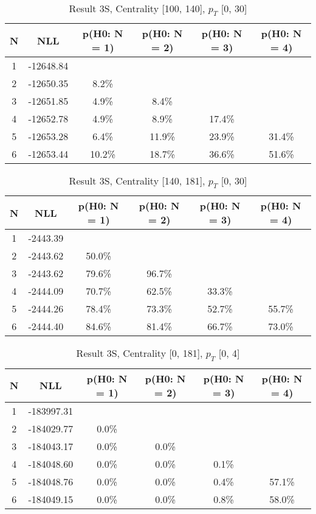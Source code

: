 \begin{table}[htb]
	\begin{center}
	\caption{Result 3S, Centrality [100, 140], $p_{T}$ [0, 30]
}
{\footnotesize\renewcommand{\arraystretch}{1.4}
		\begin{tabular}{cc||cccc}
			N & NLL & p(H0: N = 1) & p(H0: N = 2) & p(H0: N = 3) & p(H0: N = 4)\\ 
		\hline
1 & -12648.84 & & & & \\
2 & -12650.35 & 8.2\% & & & \\
3 & -12651.85 & 4.9\% & 8.4\% & & \\
4 & -12652.78 & 4.9\% & 8.9\% & 17.4\% & \\
5 & -12653.28 & 6.4\% & 11.9\% & 23.9\% & 31.4\% \\
6 & -12653.44 & 10.2\% & 18.7\% & 36.6\% & 51.6\% \\
	\end{tabular}
		\label{tab:lab}
	}
	\end{center}\end{table}

\begin{table}[htb]
	\begin{center}
	\caption{Result 3S, Centrality [140, 181], $p_{T}$ [0, 30]
}
{\footnotesize\renewcommand{\arraystretch}{1.4}
		\begin{tabular}{cc||cccc}
			N & NLL & p(H0: N = 1) & p(H0: N = 2) & p(H0: N = 3) & p(H0: N = 4)\\ 
		\hline
1 & -2443.39 & & & & \\
2 & -2443.62 & 50.0\% & & & \\
3 & -2443.62 & 79.6\% & 96.7\% & & \\
4 & -2444.09 & 70.7\% & 62.5\% & 33.3\% & \\
5 & -2444.26 & 78.4\% & 73.3\% & 52.7\% & 55.7\% \\
6 & -2444.40 & 84.6\% & 81.4\% & 66.7\% & 73.0\% \\
	\end{tabular}
		\label{tab:lab}
	}
	\end{center}\end{table}

\begin{table}[htb]
	\begin{center}
	\caption{Result 3S, Centrality [0, 181], $p_{T}$ [0, 4]
}
{\footnotesize\renewcommand{\arraystretch}{1.4}
		\begin{tabular}{cc||cccc}
			N & NLL & p(H0: N = 1) & p(H0: N = 2) & p(H0: N = 3) & p(H0: N = 4)\\ 
		\hline
1 & -183997.31 & & & & \\
2 & -184029.77 & 0.0\% & & & \\
3 & -184043.17 & 0.0\% & 0.0\% & & \\
4 & -184048.60 & 0.0\% & 0.0\% & 0.1\% & \\
5 & -184048.76 & 0.0\% & 0.0\% & 0.4\% & 57.1\% \\
6 & -184049.15 & 0.0\% & 0.0\% & 0.8\% & 58.0\% \\
	\end{tabular}
		\label{tab:lab}
	}
	\end{center}\end{table}

